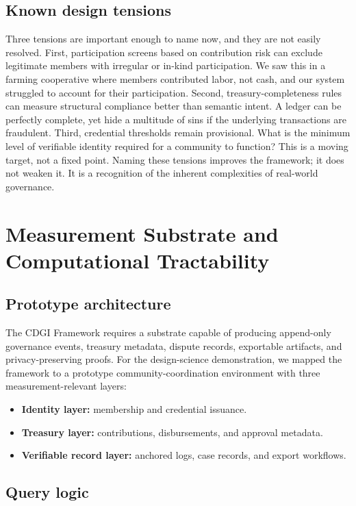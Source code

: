 \documentclass[review,onecolumn]{elsarticle}
\begin{document}
\subsection{Known design tensions}

Three tensions are important enough to name now, and they are not easily resolved. First, participation screens based on contribution risk can exclude legitimate members with irregular or in-kind participation. We saw this in a farming cooperative where members contributed labor, not cash, and our system struggled to account for their participation. Second, treasury-completeness rules can measure structural compliance better than semantic intent. A ledger can be perfectly complete, yet hide a multitude of sins if the underlying transactions are fraudulent. Third, credential thresholds remain provisional. What is the minimum level of verifiable identity required for a community to function? This is a moving target, not a fixed point. Naming these tensions improves the framework; it does not weaken it. It is a recognition of the inherent complexities of real-world governance.

\section{Measurement Substrate and Computational Tractability}

\subsection{Prototype architecture}

The CDGI Framework requires a substrate capable of producing append-only governance events, treasury metadata, dispute records, exportable artifacts, and privacy-preserving proofs. For the design-science demonstration, we mapped the framework to a prototype community-coordination environment with three measurement-relevant layers:

\begin{itemize}
\item \textbf{Identity layer:} membership and credential issuance.
\item \textbf{Treasury layer:} contributions, disbursements, and approval metadata.
\item \textbf{Verifiable record layer:} anchored logs, case records, and export workflows.
\end{itemize}

\subsection{Query logic}
\end{document}
